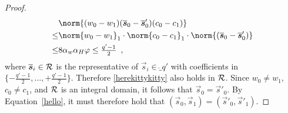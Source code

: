 \begin{proof}
\begin{align*}
      &\norm{(w_0 - w_1)(\overline{\vec{s}}_0 - \overline{\vec{s}}'_0) (c_0 - c_1)} \\
      \leq &\norm{w_0 - w_1}_1\cdot\norm{c_0 - c_1}_1\cdot \norm{(\overline{\vec{s}}_0 - \overline{\vec{s}}'_0)} \\
      \leq& 8\alpha_w\alpha_H\varphi \leq \tfrac{q'-1}{2}\enspace,
    \end{align*}
    where $\overline{\boldsymbol{s}}_i\in\mathcal{R}$ is the representative of $\vec{s}_i\in\ring_{q'}$ with coefficients in $\{-\tfrac{q'-1}{2},\ldots,+\tfrac{q'-1}{2}\}$.
    Therefore \autoref{herekittykitty} also holds in $\mathcal{R}$.
    Since $w_0 \neq w_1$, $c_0 \neq c_1$, and $\mathcal{R}$ is an integral domain, it follows that $\vec{s}_0 = \vec{s}'_0$.
    By Equation~\ref{hello}, it must therefore hold that $(\vec{s}_0, \vec{s}_1) = (\vec{s}'_0, \vec{s}'_1)$.
\end{proof}
